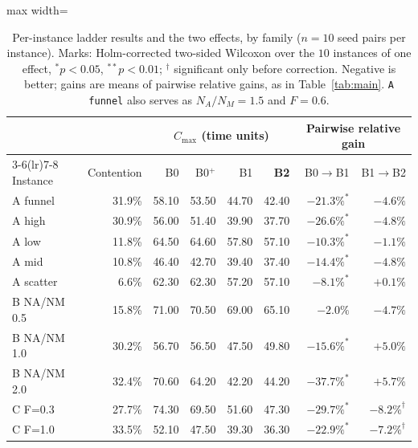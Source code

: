 \documentclass[preprint,review,12pt,authoryear,doubleblind]{elsarticle}
\newcommand{\NCases}{10}
\newcommand{\NSeeds}{10}
\begin{document}
\begin{table}[!htbp]
\caption{Per-instance ladder results and the two effects, by family ($n=\NSeeds$ seed pairs per instance). Marks: Holm-corrected two-sided Wilcoxon over the $\NCases$ instances of one effect, $^{*}p<0.05$, $^{**}p<0.01$; $^{\dagger}$ significant only before correction. Negative is better; gains are means of pairwise relative gains, as in Table~\ref{tab:main}.
\texttt{A funnel} also serves as $N_A/N_M=1.5$ and $F=0.6$.}
\label{tab:bytag}
\small
\begin{adjustbox}{max width=\linewidth}\begin{tabular}{@{}lrrrrrrr@{}}
\toprule
& & \multicolumn{4}{c}{$C_{\max}$ (time units)} & \multicolumn{2}{c}{Pairwise relative gain} \\
\cmidrule(lr){3-6}\cmidrule(lr){7-8}
Instance & Contention & B0 & B0$^{+}$ & B1 & \textbf{B2} & B0$\rightarrow$B1 & B1$\rightarrow$B2 \\
\midrule
A funnel & 31.9\% & 58.10 & 53.50 & 44.70 & 42.40 & $-21.3\%^{*}$ & $-4.6\%$ \\
A high & 30.9\% & 56.00 & 51.40 & 39.90 & 37.70 & $-26.6\%^{*}$ & $-4.8\%$ \\
A low & 11.8\% & 64.50 & 64.60 & 57.80 & 57.10 & $-10.3\%^{*}$ & $-1.1\%$ \\
A mid & 10.8\% & 46.40 & 42.70 & 39.40 & 37.40 & $-14.4\%^{*}$ & $-4.8\%$ \\
A scatter & 6.6\% & 62.30 & 62.30 & 57.20 & 57.10 & $-8.1\%^{*}$ & $+0.1\%$ \\
\midrule
B NA/NM 0.5 & 15.8\% & 71.00 & 70.50 & 69.00 & 65.10 & $-2.0\%$ & $-4.7\%$ \\
B NA/NM 1.0 & 30.2\% & 56.70 & 56.50 & 47.50 & 49.80 & $-15.6\%^{*}$ & $+5.0\%$ \\
B NA/NM 2.0 & 32.4\% & 70.60 & 64.20 & 42.20 & 44.20 & $-37.7\%^{*}$ & $+5.7\%$ \\
\midrule
C F=0.3 & 27.7\% & 74.30 & 69.50 & 51.60 & 47.30 & $-29.7\%^{*}$ & $-8.2\%^{\dagger}$ \\
C F=1.0 & 33.5\% & 52.10 & 47.50 & 39.30 & 36.30 & $-22.9\%^{*}$ & $-7.2\%^{\dagger}$ \\
\bottomrule
\end{tabular}\end{adjustbox}
\end{table}
\end{document}
